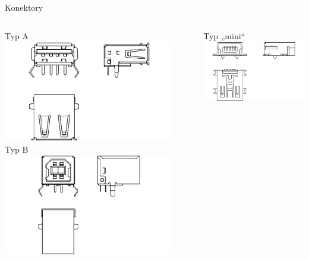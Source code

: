 \documentclass[aspectratio=43]{beamer}
\begin{document}
\begin{frame}{Konektory}
	\begin{columns}
		\begin{center}
			Typ A
			\includegraphics[width=0.9\linewidth]{extrahovane_obrazky/img_3_page3_1.png}
			Typ B
			\includegraphics[width=0.9\linewidth]{extrahovane_obrazky/img_3_page3_2.png}
		\end{center}
		\begin{center}
			Typ „mini“
			\includegraphics[width=1\linewidth]{extrahovane_obrazky/img_3_page3_3.png}
		\end{center}
	\end{columns}
	
\end{frame}
\end{document}
